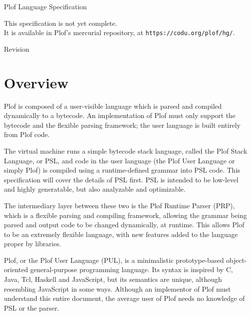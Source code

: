 \setlength{\pdfpageheight}{\paperheight}
\setlength{\pdfpagewidth}{\paperwidth}



\ifdefined\specdocheader
    \specdocheader
\else\fi

\begin{titlepage}
\begin{center}

\Huge{\textsf{Plof Language Specification}}

\small{This specification is not yet complete.\\It is available in Plof's mercurial repository, at \texttt{https://codu.org/plof/hg/}.}

\Large{\textsf{Revision }}

\large{}

\end{center}
\end{titlepage}

\tableofcontents

\chapter{Overview}

Plof is composed of a user-visible language which is parsed and compiled dynamically to a bytecode. An implementation of Plof must only support the bytecode and the flexible parsing framework; the user language is built entirely from Plof code.

The virtual machine runs a simple bytecode stack language, called the Plof Stack Language, or PSL, and code in the user language (the Plof User Language or simply Plof) is compiled using a runtime-defined grammar into PSL code. This specification will cover the details of PSL first. PSL is intended to be low-level and highly generatable, but also analyzable and optimizable.

The intermediary layer between these two is the Plof Runtime Parser (PRP), which is a flexible parsing and compiling framework, allowing the grammar being parsed and output code to be changed dynamically, at runtime. This allows Plof to be an extremely flexible language, with new features added to the language proper by libraries.

Plof, or the Plof User Language (PUL), is a minimalistic prototype-based object-oriented general-purpose programming language. Its syntax is inspired by C, Java, Tcl, Haskell and JavaScript, but its semantics are unique, although resembling JavaScript in some ways. Although an implementor of Plof must understand this entire document, the average user of Plof needs no knowledge of PSL or the parser.







